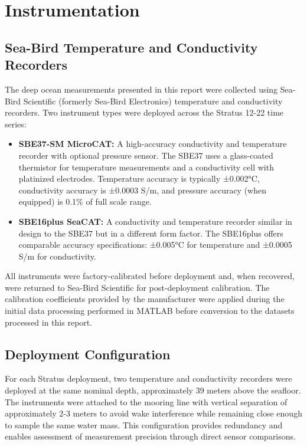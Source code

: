 \section{Instrumentation}

\subsection{Sea-Bird Temperature and Conductivity Recorders}

The deep ocean measurements presented in this report were collected using Sea-Bird Scientific (formerly Sea-Bird Electronics) temperature and conductivity recorders. Two instrument types were deployed across the Stratus 12-22 time series:

\begin{itemize}
    \item \textbf{SBE37-SM MicroCAT:} A high-accuracy conductivity and temperature recorder with optional pressure sensor. The SBE37 uses a glass-coated thermistor for temperature measurements and a conductivity cell with platinized electrodes. Temperature accuracy is typically ±0.002°C, conductivity accuracy is ±0.0003 S/m, and pressure accuracy (when equipped) is 0.1\% of full scale range.
    
    \item \textbf{SBE16plus SeaCAT:} A conductivity and temperature recorder similar in design to the SBE37 but in a different form factor. The SBE16plus offers comparable accuracy specifications: ±0.005°C for temperature and ±0.0005 S/m for conductivity.
\end{itemize}

All instruments were factory-calibrated before deployment and, when recovered, were returned to Sea-Bird Scientific for post-deployment calibration. The calibration coefficients provided by the manufacturer were applied during the initial data processing performed in MATLAB before conversion to the datasets processed in this report.

\subsection{Deployment Configuration}

For each Stratus deployment, two temperature and conductivity recorders were deployed at the same nominal depth, approximately 39 meters above the seafloor. The instruments were attached to the mooring line with vertical separation of approximately 2-3 meters to avoid wake interference while remaining close enough to sample the same water mass. This configuration provides redundancy and enables assessment of measurement precision through direct sensor comparisons.

